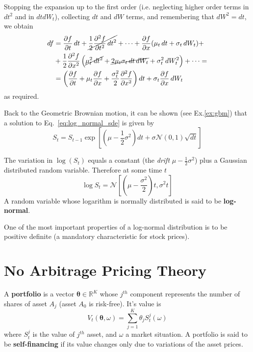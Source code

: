 \documentclass[12pt,a4paper]{book}
\begin{document}
Stopping the expansion up to the first order (i.e. neglecting higher order terms in $dt^2$ and in $dt dW_t$), collecting $dt$ and $dW$ terms, and remembering that $dW^2=dt$, we obtain
\begin{equation*}
\begin{aligned}
df&={\frac {\partial f}{\partial t}}\,dt+\cancel{{\frac {1}{2}}{\frac {\partial ^{2}f}{\partial t^{2}}}\,dt^{2}}+\cdots +{\frac {\partial f}{\partial x}}(\mu _{t}\,dt+\sigma _{t}\,dW_{t})+\\
&+{\frac {1}{2}}{\frac {\partial ^{2}f}{\partial x^{2}}}\left(\cancel{\mu _{t}^{2}\,dt^{2}}+\cancel{2\mu _{t}\sigma _{t}\,dt\,dW_{t}}+\sigma _{t}^{2}\,dW_{t}^{2}\right)+\cdots =\\
&=\left({\frac {\partial f}{\partial t}}+\mu _{t}{\frac {\partial f}{\partial x}}+{\frac {\sigma _{t}^{2}}{2}}{\frac {\partial ^{2}f}{\partial x^{2}}}\right)dt+\sigma _{t}{\frac {\partial f}{\partial x}}\,dW_{t}
\end{aligned}
\end{equation*}
as required.

Back to the Geometric Brownian motion, it can be shown (see Ex.\ref{ex:gbm}) that a solution to Eq.~\ref{eq:log_normal_sde} is given by 
\begin{equation}
S_t = S_{t-1}\exp\left[\left(\mu-\frac{1}{2}\sigma^2\right)dt + \sigma\mathcal{N}(0,1)\sqrt{dt}\right] 
\label{eq:lognormal_solution}
\end{equation}

The variation in $\log(S_t)$ equals a constant (the \emph{drift} $\mu-\frac{1}{2}\sigma^2$) plus a Gaussian distributed random variable. Therefore at some time $t$
\begin{equation*}
\log S_t = \mathcal{N}\left[\left(\mu -\frac{\sigma^2}{2}\right)t, \sigma^2 t\right]
\end{equation*}
A random variable whose logarithm is normally distributed is said to be \textbf{log-normal}.
			
One of the most important properties of a log-normal distribution is to be positive definite (a mandatory characteristic for stock prices).

\section{No Arbitrage Pricing Theory}

A \textbf{portfolio} is a vector $\mathbf{\theta}\in \mathbb{R}^K$ whose $j^{th}$ component represents the number of shares of asset $A_j$ (asset $A_0$ is risk-free). It's value is
\begin{equation}
V_t(\mathbf{\theta}, \omega)=\sum_{j=1}^K\theta_jS^j_t(\omega)
\end{equation} 
where $S_t^j$ is the value of $j^{th}$ asset, and $\omega$ a market situation. A portfolio is said to be \textbf{self-financing} if its value changes only due to variations of the asset prices.
\end{document}

